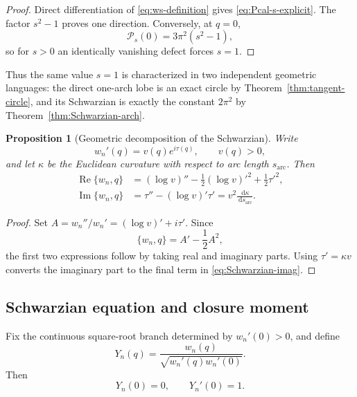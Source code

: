 \documentclass[11pt]{amsart}
\numberwithin{equation}{section}
\newtheorem{proposition}[theorem]{Proposition}
\theoremstyle{definition}
\theoremstyle{remark}
\newcommand{\dd}{\,\mathrm d}
\newcommand{\Ree}{\operatorname{Re}}
\newcommand{\Imm}{\operatorname{Im}}
\newcommand{\Pcal}{\mathcal P}
\begin{document}
\begin{proof}
Direct differentiation of \eqref{eq:ws-definition} gives \eqref{eq:Pcal-s-explicit}.  The factor $s^2-1$ proves one direction.  Conversely, at $q=0$,
\begin{equation}
\Pcal_s(0)=3\pi^2(s^2-1),
\label{eq:Pcal-s-zero}
\end{equation}
so for $s>0$ an identically vanishing defect forces $s=1$.
\end{proof}

Thus the same value $s=1$ is characterized in two independent geometric languages: the direct one-arch lobe is an exact circle by Theorem~\ref{thm:tangent-circle}, and its Schwarzian is exactly the constant $2\pi^2$ by Theorem~\ref{thm:Schwarzian-arch}.

\begin{proposition}[Geometric decomposition of the Schwarzian]
\label{prop:Schwarzian-geometry}
Write
\begin{equation}
w_n'(q)=v(q)e^{i\tau(q)},
\qquad v(q)>0,
\label{eq:tangent-polar}
\end{equation}
and let $\kappa$ be the Euclidean curvature with respect to arc length $s_{\mathrm{arc}}$.  Then
\begin{align}
\Ree\{w_n,q\}
&=(\log v)''-\frac12(\log v)'^2+\frac12\tau'^2,
\label{eq:Schwarzian-real}\\
\Imm\{w_n,q\}
&=\tau''-(\log v)'\tau'
=v^2\frac{\dd\kappa}{\dd s_{\mathrm{arc}}}.
\label{eq:Schwarzian-imag}
\end{align}
\end{proposition}

\begin{proof}
Set $A=w_n''/w_n'=(\log v)'+i\tau'$.  Since
\begin{equation}
\{w_n,q\}=A'-\frac12A^2,
\label{eq:Schwarzian-A}
\end{equation}
the first two expressions follow by taking real and imaginary parts.  Using $\tau'=\kappa v$ converts the imaginary part to the final term in \eqref{eq:Schwarzian-imag}.
\end{proof}

\subsection{Schwarzian equation and closure moment}
\label{subsec:Schwarzian-ode}

Fix the continuous square-root branch determined by $w_n'(0)>0$, and define
\begin{equation}
Y_n(q)=\frac{w_n(q)}{\sqrt{w_n'(q)w_n'(0)}}.
\label{eq:Y-definition}
\end{equation}
Then
\begin{equation}
Y_n(0)=0,
\qquad
Y_n'(0)=1.
\label{eq:Y-initial}
\end{equation}
\end{document}
